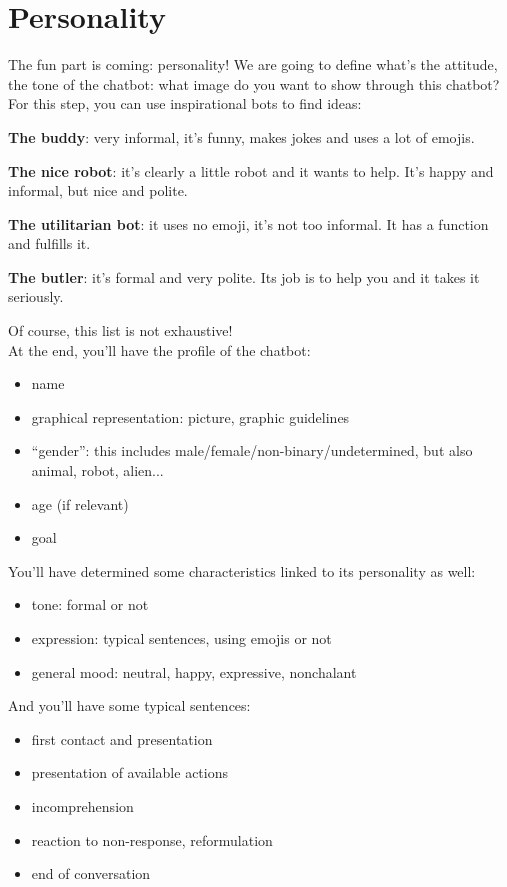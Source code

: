 \documentclass{article}
\begin{document}
\section{Personality}
The fun part is coming: personality! We are going to define what’s the attitude, the tone of the chatbot: what image do you want to show through this chatbot? For this step, you can use inspirational bots to find ideas: 
\begin{description}
    \item \textbf{The buddy}: very informal, it's funny, makes jokes and uses a lot of emojis.
    \item \textbf{The nice robot}: it's clearly a little robot and it wants to help. It's happy and informal, but nice and polite.
    \item \textbf{The utilitarian bot}: it uses no emoji, it's not too informal. It has a function and fulfills it.
    \item \textbf{The butler}: it's formal and very polite. Its job is to help you and it takes it seriously.
\end{description}
Of course, this list is not exhaustive!\\
At the end, you’ll have the profile of the chatbot: 
\begin{itemize}
    \item name
    \item graphical representation: picture, graphic guidelines 
    \item “gender”: this includes male/female/non-binary/undetermined, but also animal, robot, alien...
    \item age (if relevant)
    \item goal
\end{itemize}
You'll have determined some characteristics linked to its personality as well: 
\begin{itemize}
    \item tone: formal or not
    \item expression: typical sentences, using emojis or not
    \item general mood: neutral, happy, expressive, nonchalant
\end{itemize} 
And you'll have some typical sentences:
\begin{itemize}
    \item first contact and presentation
    \item presentation of available actions
    \item incomprehension
    \item reaction to non-response, reformulation
    \item end of conversation
\end{itemize}
\end{document}
